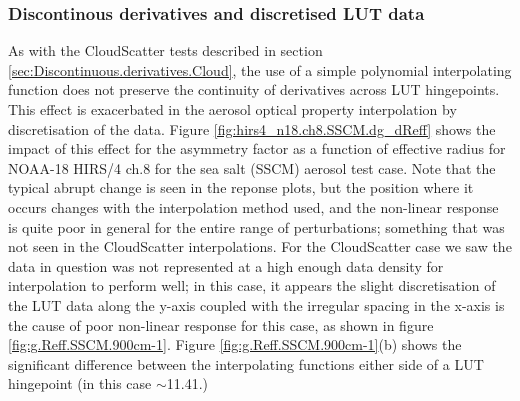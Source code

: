 \subsubsection{Discontinous derivatives and discretised LUT data}
As with the CloudScatter tests described in section \ref{sec:Discontinuous.derivatives.Cloud}, the use of a simple polynomial interpolating function does not preserve the continuity of derivatives across LUT hingepoints. This effect is exacerbated in the aerosol optical property interpolation by discretisation of the data. Figure \ref{fig:hirs4_n18.ch8.SSCM.dg_dReff} shows the impact of this effect for the asymmetry factor as a function of effective radius for NOAA-18 HIRS/4 ch.8 for the sea salt (SSCM) aerosol test case. Note that the typical abrupt change is seen in the reponse plots, but the position where it occurs changes with the interpolation method used, and the non-linear response is quite poor in general for the entire range of perturbations; something that was not seen in the CloudScatter interpolations. For the CloudScatter case we saw the data in question was not represented at a high enough data density for interpolation to perform well; in this case, it appears the slight discretisation of the LUT data along the y-axis coupled with the irregular spacing in the x-axis is the cause of poor non-linear response for this case, as shown in figure \ref{fig:g.Reff.SSCM.900cm-1}. Figure \ref{fig:g.Reff.SSCM.900cm-1}(b) shows the significant difference between the interpolating functions either side of a LUT hingepoint (in this case $\sim$11.41\micron.)

